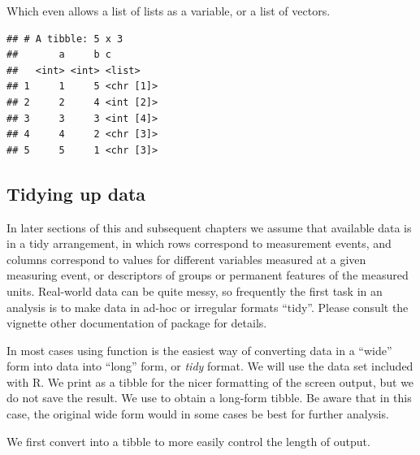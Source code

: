 \documentclass[krantz2,ChapterTOCs]{krantz}\usepackage{knitr}
\begin{document}
Which even allows a list of lists as a variable, or a list of vectors.

\begin{knitrout}\footnotesize
{}\color{fgcolor}\begin{kframe}
\begin{alltt}
\hlstd{(} \hlstd{=} \hlopt{:}\hlstd{,}  \hlstd{=} \hlopt{:}\hlstd{,}  \hlstd{=} \hlstd{(}\hlstd{,} \hlopt{:}\hlstd{,} \hlopt{:}\hlstd{, letters[}\hlopt{:}\hlstd{], letters[}\hlopt{:}\hlstd{]))}
\end{alltt}
\begin{verbatim}
## # A tibble: 5 x 3
##       a     b c        
##   <int> <int> <list>   
## 1     1     5 <chr [1]>
## 2     2     4 <int [2]>
## 3     3     3 <int [4]>
## 4     4     2 <chr [3]>
## 5     5     1 <chr [3]>
\end{verbatim}
\end{kframe}
\end{knitrout}

\subsection{Tidying up data}

In later sections of this and subsequent chapters we assume that available data is in a tidy arrangement, in which rows correspond to measurement events, and columns correspond to values for different variables measured at a given measuring event, or descriptors of groups or permanent features of the measured units. Real-world data can be quite messy, so frequently the first task in an analysis is to make data in ad-hoc or irregular formats ``tidy''. Please consult the vignette other documentation of package  for details.

In most cases using function  is the easiest way of converting data in a ``wide'' form into data into ``long'' form, or \emph{tidy} format. We will use the  data set included with R. We print  as a tibble for the nicer formatting of the screen output, but we do not save the result. We use  to obtain a long-form tibble. Be aware that in this case, the original wide form would in some cases be best for further analysis.

We first convert  into a tibble to more easily control the length of output.
\end{document}
